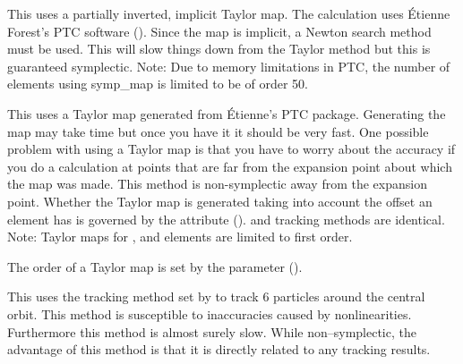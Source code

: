 \begin{description}
\item[\vn{Symp_Map}]
This uses a partially inverted, implicit Taylor map. The calculation
uses \'Etienne Forest's PTC software ().  Since the map is implicit, a Newton
search method must be used. This will slow things down from the Taylor
method but this is guaranteed symplectic. Note: Due to memory limitations
in PTC, the number of elements using symp_map is limited to be of order 50.

\item[\vn{Taylor}]
This uses a Taylor map generated from \'Etienne's PTC
package. Generating the map may take time but once you have it it
should be very fast. One possible problem with using a Taylor map is
that you have to worry about the accuracy if you do a calculation at
points that are far from the expansion point about which the map was
made. This method is non-symplectic away from the expansion
point. Whether the Taylor map is generated taking into account the
offset an element has is governed by the 
attribute ().  and 
tracking methods are identical. Note: Taylor maps for , and
 elements are limited to first order.

The order of a Taylor map is set by the 
parameter ().

\item[\vn{Tracking}]
This uses the tracking method set by  to track 6
particles around the central orbit. This method is susceptible to inaccuracies
caused by nonlinearities. Furthermore this method
is almost surely slow. While non--symplectic, the advantage of this method
is that it is directly related to any tracking results.

\end{description}

